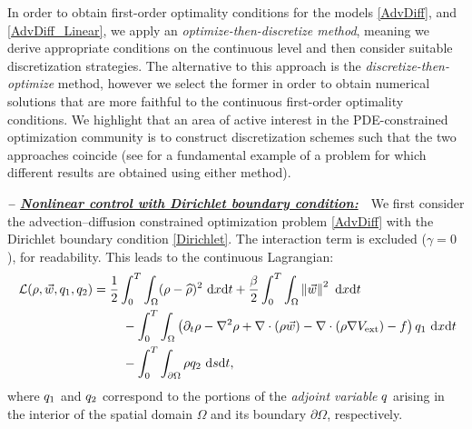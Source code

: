 In order to obtain first-order optimality conditions for the models \eqref{AdvDiff}, and \eqref{AdvDiff_Linear}, we apply an \emph{optimize-then-discretize method}, meaning we derive appropriate conditions on the continuous level and then consider suitable discretization strategies. The alternative to this approach is the \emph{discretize-then-optimize} method, however we select the former in order to obtain numerical solutions that are more faithful to the continuous first-order optimality conditions. We highlight that an area of active interest in the PDE-constrained optimization community is to construct discretization schemes such that the two approaches coincide (see \cite{CollisHeinkenschloss} for a fundamental example of a problem for which different results are obtained using either method).

\vspace{0.75em}

\textbf{\emph{-- \underline{Nonlinear control with Dirichlet boundary condition:}}}~~We first consider the advection--diffusion constrained optimization problem \eqref{AdvDiff} with the Dirichlet boundary condition \eqref{Dirichlet}. The interaction term is excluded ($\gamma = 0$), for readability. This leads to the continuous Lagrangian:
\begin{align}
\ \label{Lagrangian} \mathcal{L}(\rho,\vec{w},\adj_1,\adj_2)={}&\frac{1}{2}\int_0^T\int_{\Omega}(\rho-\widehat{\rho})^2~{\rm d}x{\rm d}t+\frac{\beta}{2}\int_0^T\int_{\Omega}\left\|\vec{w}\right\|^2~{\rm d}x{\rm d}t \\
\ \nonumber &\quad-\int_0^T\int_{\Omega}\left(\partial_{t}\rho-\nabla^{2}\rho+\nabla\cdot(\rho\vec{w})-\nabla\cdot(\rho\nabla{}V_{\text{ext}})-f\right)\adj_1~{\rm d}x{\rm d}t \\
\ \nonumber &\quad-\int_0^T\int_{\partial\Omega}\rho{}\adj_2~{\rm d}s{\rm d}t,
\end{align}
where $q_1$ and $q_2$ correspond to the portions of the \emph{adjoint variable} $q$ arising in the interior of the spatial domain $\Omega$ and its boundary $\partial\Omega$, respectively.

